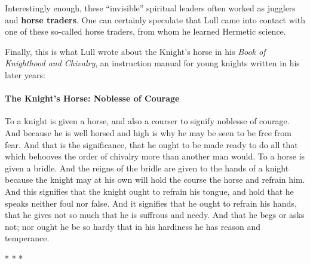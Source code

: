 Interestingly enough, these ``invisible'' spiritual leaders often worked as jugglers and \textbf{horse traders}. One can certainly speculate that Lull came into contact with one of these so-called horse traders, from whom he learned Hermetic science.

Finally, this is what Lull wrote about the Knight's horse in his \emph{Book of Knighthood and Chivalry}, an instruction manual for young knights written in his later years:

\paragraph{The Knight's Horse: Noblesse of Courage}

\begin{quotex}
To a knight is given a horse, and also a courser to signify noblesse of courage. And because he is well horsed and high is why he may be seen to be free from fear. And that is the significance, that he ought to be made ready to do all that which behooves the order of chivalry more than another man would. To a horse is given a bridle. And the reigns of the bridle are given to the hands of a knight because the knight may at his own will hold the course the horse and refrain him. And this signifies that the knight ought to refrain his tongue, and hold that he speaks neither foul nor false. And it signifies that he ought to refrain his hands, that he gives not so much that he is suffrous and needy. And that he begs or asks not; nor ought he be so hardy that in his hardiness he has reason and temperance.
\end{quotex}




\begin{center}* * *\end{center}

